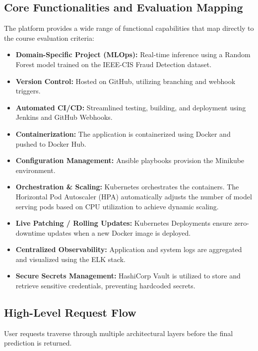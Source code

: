 \documentclass[12pt,a4paper]{article}
\begin{document}
\newpage

\subsection{Core Functionalities and Evaluation Mapping}
The platform provides a wide range of functional capabilities that map directly to the course evaluation criteria:
\begin{itemize}
    \item \textbf{Domain-Specific Project (MLOps):} Real-time inference using a Random Forest model trained on the IEEE-CIS Fraud Detection dataset.
    \item \textbf{Version Control:} Hosted on GitHub, utilizing branching and webhook triggers.
    \item \textbf{Automated CI/CD:} Streamlined testing, building, and deployment using Jenkins and GitHub Webhooks.
    \item \textbf{Containerization:} The application is containerized using Docker and pushed to Docker Hub.
    \item \textbf{Configuration Management:} Ansible playbooks provision the Minikube environment.
    \item \textbf{Orchestration \& Scaling:} Kubernetes orchestrates the containers. The Horizontal Pod Autoscaler (HPA) automatically adjusts the number of model serving pods based on CPU utilization to achieve dynamic scaling.
    \item \textbf{Live Patching / Rolling Updates:} Kubernetes Deployments ensure zero-downtime updates when a new Docker image is deployed.
    \item \textbf{Centralized Observability:} Application and system logs are aggregated and visualized using the ELK stack.
    \item \textbf{Secure Secrets Management:} HashiCorp Vault is utilized to store and retrieve sensitive credentials, preventing hardcoded secrets.
\end{itemize}

\subsection{High-Level Request Flow}
User requests traverse through multiple architectural layers before the final prediction is returned. 
\end{document}
